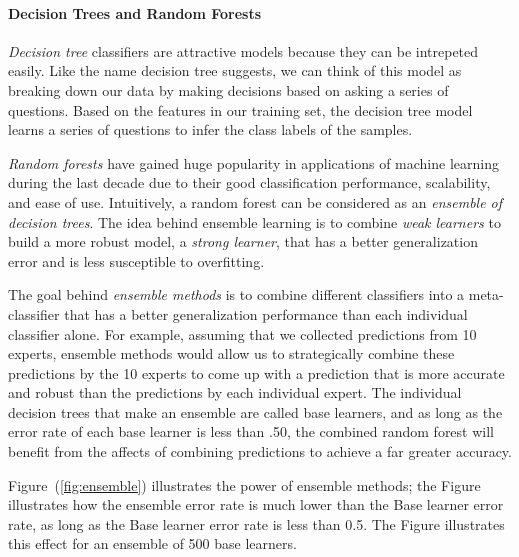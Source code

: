 \documentclass[10pt,letterpaper]{article}
\begin{document}
\paragraph{Decision Trees and Random Forests}
\emph{Decision tree} classifiers are attractive models because they can be intrepeted easily. Like the name decision tree suggests, we can think of this model as breaking down our data by making decisions based on asking a series of questions.
Based on the features in our training set, the decision tree model learns a series of questions to infer the class labels of the samples. 

\emph{Random forests} have gained huge popularity in applications of machine learning during the last decade due to their good classification performance, scalability, and ease of use. Intuitively, a random forest can be considered as an \emph{ensemble of decision trees}. The idea behind ensemble learning is to combine \emph{weak learners} to build a more robust model, a \emph{strong learner}, that has a better generalization error and is less susceptible to overfitting. 

The goal behind \emph{ensemble methods} is to combine different classifiers into a meta-classifier that has a better generalization performance than each individual classifier alone. For example, assuming that we collected predictions from 10 experts, ensemble methods would allow us to strategically combine these predictions by the 10 experts to come up with a prediction that is more accurate and robust than the predictions by each individual expert. The individual decision trees that make an ensemble are called base learners, and as long as the error rate of each base learner is less than .50, the combined random forest will benefit from the affects of combining predictions to achieve a far greater accuracy.

Figure~(\ref{fig:ensemble}) illustrates the power of ensemble methods; the Figure illustrates how the ensemble error rate is much lower than the Base learner error rate, as long as the Base learner error rate is less than 0.5. The Figure illustrates this effect for an ensemble of 500 base learners.
\end{document}
